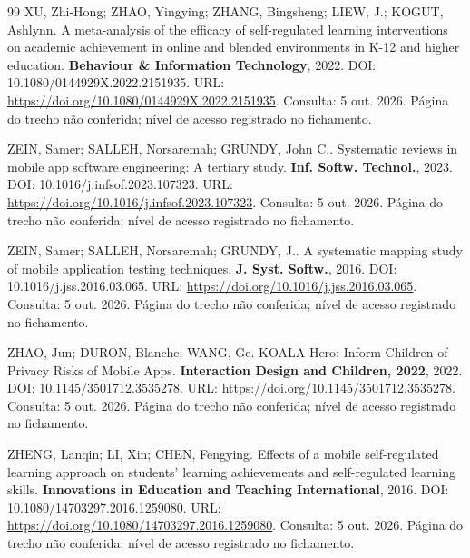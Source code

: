 \begin{thebibliography}{99}
 XU, Zhi-Hong; ZHAO, Yingying; ZHANG, Bingsheng; LIEW, J.; KOGUT, Ashlynn. A meta-analysis of the efficacy of self-regulated learning interventions on academic achievement in online and blended environments in K-12 and higher education. \textbf{Behaviour \& Information Technology}, 2022. DOI: 10.1080/0144929X.2022.2151935. URL: \url{https://doi.org/10.1080/0144929X.2022.2151935}. Consulta: 5 out. 2026. Página do trecho não conferida; nível de acesso registrado no fichamento.


 ZEIN, Samer; SALLEH, Norsaremah; GRUNDY, John C.. Systematic reviews in mobile app software engineering: A tertiary study. \textbf{Inf. Softw. Technol.}, 2023. DOI: 10.1016/j.infsof.2023.107323. URL: \url{https://doi.org/10.1016/j.infsof.2023.107323}. Consulta: 5 out. 2026. Página do trecho não conferida; nível de acesso registrado no fichamento.


 ZEIN, Samer; SALLEH, Norsaremah; GRUNDY, J.. A systematic mapping study of mobile application testing techniques. \textbf{J. Syst. Softw.}, 2016. DOI: 10.1016/j.jss.2016.03.065. URL: \url{https://doi.org/10.1016/j.jss.2016.03.065}. Consulta: 5 out. 2026. Página do trecho não conferida; nível de acesso registrado no fichamento.


 ZHAO, Jun; DURON, Blanche; WANG, Ge. KOALA Hero: Inform Children of Privacy Risks of Mobile Apps. \textbf{Interaction Design and Children, 2022}, 2022. DOI: 10.1145/3501712.3535278. URL: \url{https://doi.org/10.1145/3501712.3535278}. Consulta: 5 out. 2026. Página do trecho não conferida; nível de acesso registrado no fichamento.


 ZHENG, Lanqin; LI, Xin; CHEN, Fengying. Effects of a mobile self-regulated learning approach on students’ learning achievements and self-regulated learning skills. \textbf{Innovations in Education and Teaching International}, 2016. DOI: 10.1080/14703297.2016.1259080. URL: \url{https://doi.org/10.1080/14703297.2016.1259080}. Consulta: 5 out. 2026. Página do trecho não conferida; nível de acesso registrado no fichamento.

\end{thebibliography}
